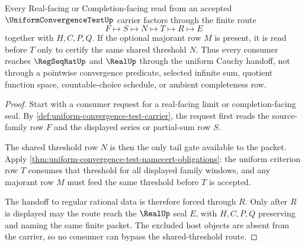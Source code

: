 \begin{theorem}
\label{thm:uniform-convergence-test-cauchy-handoff}
Every Real-facing or Completion-facing read from an accepted $\UniformConvergenceTestUp$ carrier factors through the finite route
$$
F \longmapsto S \longmapsto N \longmapsto T \longmapsto R \longmapsto E
$$
together with $H,C,P,Q$. If the optional majorant row $M$ is present, it is read before $T$ only to certify the same shared threshold $N$. Thus every consumer reaches $\RegSeqRatUp$ and $\RealUp$ through the uniform Cauchy handoff, not through a pointwise convergence predicate, selected infinite sum, quotient function space, countable-choice schedule, or ambient completeness row.
\end{theorem}
\begin{proof}
Start with a consumer request for a real-facing limit or completion-facing seal. By \autoref{def:uniform-convergence-test-carrier}, the request first reads the source-family row $F$ and the displayed series or partial-sum row $S$.

The shared threshold row $N$ is then the only tail gate available to the packet. Apply \autoref{thm:uniform-convergence-test-namecert-obligations}: the uniform criterion row $T$ consumes that threshold for all displayed family windows, and any majorant row $M$ must feed the same threshold before $T$ is accepted.

The handoff to regular rational data is therefore forced through $R$. Only after $R$ is displayed may the route reach the $\RealUp$ seal $E$, with $H,C,P,Q$ preserving and naming the same finite packet. The excluded host objects are absent from the carrier, so no consumer can bypass the shared-threshold route.
\end{proof}


\begin{closurestatus}{\UniformConvergenceTestUp}
  \theoryclosure{\seedClosure}
  \formalstatus{\unformalizedV}
\end{closurestatus}
